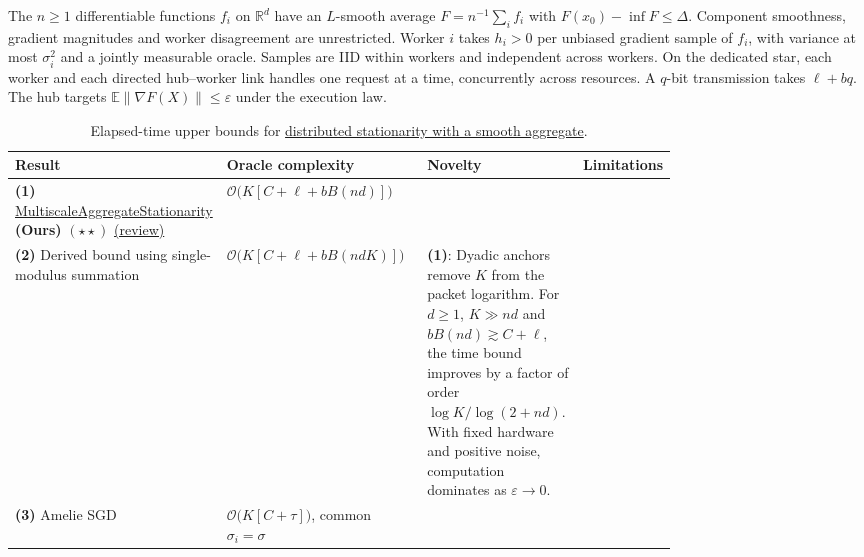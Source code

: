 \begin{table}[tp]
\centering
\caption{Elapsed-time upper bounds for \href{https://github.com/k3nfalt/longtails/blob/main/LongTails/Setups/DistributedAggregateSmoothNonconvex.lean}{distributed stationarity with a smooth aggregate}.}\label{tab:DistributedAggregateSmoothNonconvex}
\parbox{\linewidth}{\footnotesize The $n\ge1$ differentiable functions $f_i$ on $\mathbb R^d$ have an $L$-smooth average $F=n^{-1}\sum_i f_i$ with $F(x_0)-\inf F\le\Delta$. Component smoothness, gradient magnitudes and worker disagreement are unrestricted. Worker $i$ takes $h_i>0$ per unbiased gradient sample of $f_i$, with variance at most $\sigma_i^2$ and a jointly measurable oracle. Samples are IID within workers and independent across workers. On the dedicated star, each worker and each directed hub--worker link handles one request at a time, concurrently across resources. A $q$-bit transmission takes $\ell+bq$. The hub targets $\mathbb E\|\nabla F(X)\|\le\varepsilon$ under the execution law.}\par\smallskip
\begin{threeparttable}
\footnotesize
\setlength{\tabcolsep}{4pt}\renewcommand{\arraystretch}{1.25}
\begin{tabularx}{\linewidth}{@{}>{\raggedright\arraybackslash}p{0.20\linewidth}>{\raggedright\arraybackslash}p{0.32\linewidth}>{\raggedright\arraybackslash}p{0.25\linewidth}>{\raggedright\arraybackslash}X@{}}
\toprule
\textbf{Result} & \textbf{Oracle complexity} & \textbf{Novelty} & \textbf{Limitations} \\
\midrule
\textbf{(1)} \href{https://github.com/k3nfalt/longtails/blob/main/LongTails/Theorems/MultiscaleAggregateStationarity.lean}{Multiscale\allowbreak Aggregate\allowbreak Stationarity} \textbf{(Ours)} $(\star\star)$ \href{https://github.com/k3nfalt/longtails/blob/main/scripts/reviews/MultiscaleAggregateStationarity.md}{(review)}
& $\mathcal{O}\bigl(K[C+\ell+bB(nd)]\bigr)$ & & \\
\midrule[1.2pt]
\textbf{(2)} Derived bound using single-modulus summation \citep{dasnBonawitz2019}
& $\mathcal{O}\bigl(K[C+\ell+bB(ndK)]\bigr)$
& \textbf{(1)}: Dyadic anchors remove $K$ from the packet logarithm. For $d\ge1$, $K\gg nd$ and $bB(nd)\gtrsim C+\ell$, the time bound improves by a factor of order $\log K/\log(2+nd)$. With fixed hardware and positive noise, computation dominates as $\varepsilon\to0$.
& \\
\midrule
\textbf{(3)} Amelie SGD \citep[Cor.~2]{dasnAmelie2024}
& $\mathcal{O}\bigl(K[C+\tau]\bigr)$, common $\sigma_i=\sigma$

\end{tabularx}
\end{threeparttable}
\end{table}
